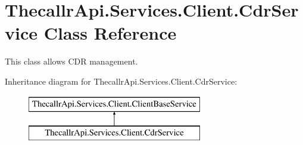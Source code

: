 \hypertarget{class_thecallr_api_1_1_services_1_1_client_1_1_cdr_service}{\section{Thecallr\+Api.\+Services.\+Client.\+Cdr\+Service Class Reference}
\label{class_thecallr_api_1_1_services_1_1_client_1_1_cdr_service}
}


This class allows C\+D\+R management.  


Inheritance diagram for Thecallr\+Api.\+Services.\+Client.\+Cdr\+Service\+:\begin{figure}[H]
\begin{center}
\leavevmode
\includegraphics[height=2.000000cm]{class_thecallr_api_1_1_services_1_1_client_1_1_cdr_service}
\end{center}
\end{figure}
